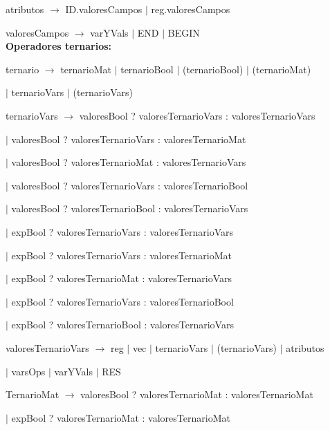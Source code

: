 atributos $\rightarrow$ ID.valoresCampos $|$ reg.valoresCampos

valoresCampos $\rightarrow$ varYVals $|$ END $|$ BEGIN \\

\textbf{Operadores ternarios:}

ternario $\rightarrow$ ternarioMat $|$ ternarioBool $|$ (ternarioBool) $|$ (ternarioMat) 

\hspace{15mm}$|$ ternarioVars  $|$ (ternarioVars)

ternarioVars $\rightarrow$ valoresBool ? valoresTernarioVars : valoresTernarioVars  

  \hspace{15mm}$|$  valoresBool ? valoresTernarioVars : valoresTernarioMat 
  
  \hspace{15mm}$|$  valoresBool ? valoresTernarioMat : valoresTernarioVars
  
  \hspace{15mm}$|$  valoresBool ? valoresTernarioVars : valoresTernarioBool 
  
  \hspace{15mm}$|$  valoresBool ? valoresTernarioBool : valoresTernarioVars
  
  \hspace{15mm}$|$  expBool ? valoresTernarioVars : valoresTernarioVars
  
  \hspace{15mm}$|$  expBool ? valoresTernarioVars : valoresTernarioMat 
  
  \hspace{15mm}$|$  expBool ? valoresTernarioMat : valoresTernarioVars
  
  \hspace{15mm}$|$  expBool ? valoresTernarioVars : valoresTernarioBool 
  
  \hspace{15mm}$|$  expBool ? valoresTernarioBool : valoresTernarioVars  
  

  
valoresTernarioVars $\rightarrow$ reg $|$ vec $|$ ternarioVars $|$ (ternarioVars) $|$ atributos 

\hspace{15mm}$|$ varsOps  $|$ varYVals $|$ RES

TernarioMat $\rightarrow$ valoresBool ? valoresTernarioMat : valoresTernarioMat  

\hspace{15mm}$|$ expBool ? valoresTernarioMat : valoresTernarioMat
  
